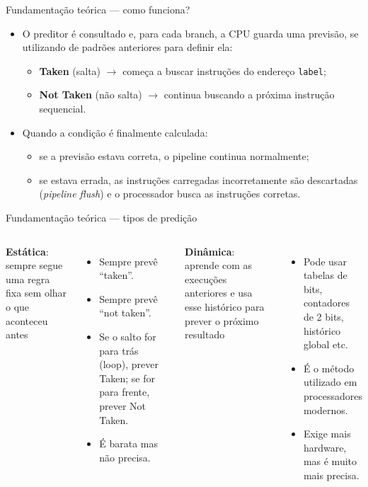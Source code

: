 \documentclass[aspectratio=169,11pt]{beamer}
\begin{document}
\begin{frame}{Fundamentação teórica --- como funciona?}
  \begin{itemize}
    \item O preditor é consultado e, para cada branch, a CPU guarda uma
          previsão, se utilizando de padrões anteriores para definir ela:
      \begin{itemize}
        \item \textbf{Taken} (salta) $\rightarrow$ começa a buscar instruções
              do endereço \texttt{label};
        \item \textbf{Not Taken} (não salta) $\rightarrow$ continua buscando a
              próxima instrução sequencial.
      \end{itemize}
    \item Quando a condição é finalmente calculada:
      \begin{itemize}
        \item se a previsão estava correta, o pipeline continua normalmente;
        \item se estava errada, as instruções carregadas incorretamente são
              descartadas (\emph{pipeline flush}) e o processador busca as
              instruções corretas.
      \end{itemize}
  \end{itemize}
\end{frame}

\begin{frame}{Fundamentação teórica --- tipos de predição}
  \begin{columns}[t]
      \textbf{Estática}: sempre segue uma regra fixa sem olhar o que
      aconteceu antes
      \begin{itemize}
        \item Sempre prevê ``taken''.
        \item Sempre prevê ``not taken''.
        \item Se o salto for para trás (loop), prever Taken; se for para
              frente, prever Not Taken.
        \item É barata mas não precisa.
      \end{itemize}
      \textbf{Dinâmica}: aprende com as execuções anteriores e usa esse
      histórico para prever o próximo resultado
      \begin{itemize}
        \item Pode usar tabelas de bits, contadores de 2 bits, histórico
              global etc.
        \item É o método utilizado em processadores modernos.
        \item Exige mais hardware, mas é muito mais precisa.
      \end{itemize}
  \end{columns}
\end{frame}
\end{document}
